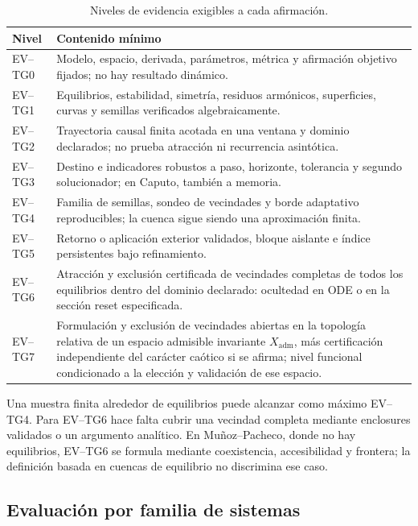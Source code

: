 \begin{table}[H]
\centering
\caption{Niveles de evidencia exigibles a cada afirmación.}
\label{camp:tab-evidence-levels}
\begin{tabularx}{\linewidth}{@{}lY@{}}
\toprule
Nivel & Contenido mínimo\\
\midrule
EV--TG0 & Modelo, espacio, derivada, parámetros, métrica y afirmación objetivo
fijados; no hay resultado dinámico.\\
EV--TG1 & Equilibrios, estabilidad, simetría, residuos armónicos, superficies,
curvas y semillas verificados algebraicamente.\\
EV--TG2 & Trayectoria causal finita acotada en una ventana y dominio declarados;
no prueba atracción ni recurrencia asintótica.\\
EV--TG3 & Destino e indicadores robustos a paso, horizonte, tolerancia y segundo
solucionador; en Caputo, también a memoria.\\
EV--TG4 & Familia de semillas, sondeo de vecindades y borde adaptativo
reproducibles; la cuenca sigue siendo una aproximación finita.\\
EV--TG5 & Retorno o aplicación exterior validados, bloque aislante e índice
persistentes bajo refinamiento.\\
EV--TG6 & Atracción y exclusión certificada de vecindades completas de todos los
equilibrios dentro del dominio declarado: ocultedad en ODE o en la sección
reset especificada.\\
EV--TG7 & Formulación y exclusión de vecindades abiertas en la topología relativa
de un espacio admisible invariante \(X_{\mathrm{adm}}\), más certificación
independiente del carácter caótico si se afirma; nivel funcional condicionado
a la elección y validación de ese espacio.\\
\bottomrule
\end{tabularx}
\end{table}

Una muestra finita alrededor de equilibrios puede alcanzar como máximo
EV--TG4. Para EV--TG6 hace falta cubrir una vecindad completa mediante
enclosures validados o un argumento analítico. En Muñoz--Pacheco, donde no hay
equilibrios, EV--TG6 se formula mediante coexistencia, accesibilidad y frontera;
la definición basada en cuencas de equilibrio no discrimina ese caso.

\subsection{Evaluación por familia de sistemas}
\label{camp:case-execution}

